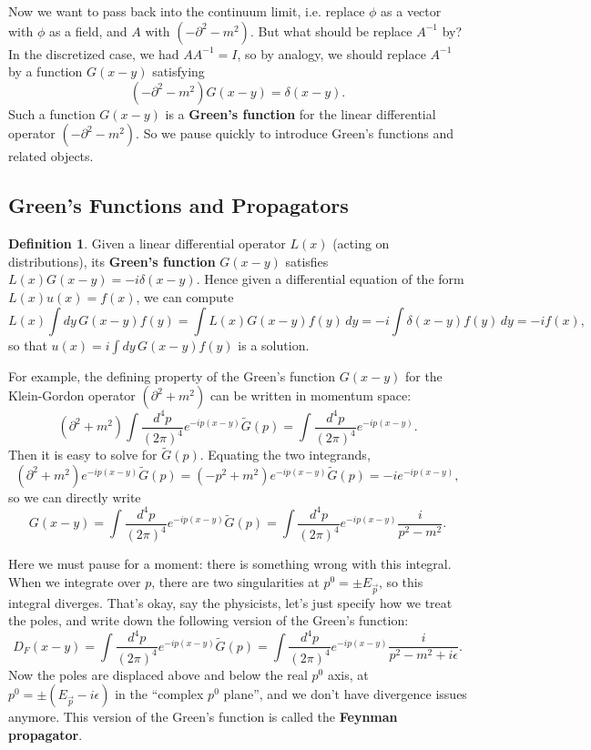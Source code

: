 \documentclass{report}
\theoremstyle{plain}
\theoremstyle{definition}
\newtheorem{definition}[theorem]{Definition}
\theoremstyle{remark}
\begin{document}
Now we want to pass back into the continuum limit, i.e. replace $\phi$
as a vector with $\phi$ as a field, and $A$ with
$(-\partial^2 - m^2)$. But what should be replace $A^{-1}$ by? In the
discretized case, we had $AA^{-1} = I$, so by analogy, we should
replace $A^{-1}$ by a function $G(x - y)$ satisfying
$$ (-\partial^2 - m^2)G(x - y) = \delta(x - y). $$
Such a function $G(x - y)$ is a {\bf Green's function} for the linear
differential operator $(-\partial^2 - m^2)$. So we pause quickly to
introduce Green's functions and related objects.

\subsection{Green's Functions and Propagators}

\begin{definition}
  Given a linear differential operator $L(x)$ (acting on
  distributions), its {\bf Green's function} $G(x - y)$ satisfies
  $L(x)G(x - y) = -i\delta(x - y)$. Hence given a differential
  equation of the form $L(x)u(x) = f(x)$, we can compute
  $$ L(x) \int dy \, G(x - y)f(y) = \int L(x) G(x - y) f(y) \, dy = -i \int \delta(x - y) f(y) \, dy = -i f(x), $$
  so that $u(x) = i \int dy \, G(x - y) f(y)$ is a solution.
\end{definition}

For example, the defining property of the Green's function $G(x - y)$
for the Klein-Gordon operator $(\partial^2 + m^2)$ can be written in
momentum space:
$$ (\partial^2 + m^2) \int \frac{d^4p}{(2\pi)^4} e^{-ip(x-y)} \tilde{G}(p) = \int \frac{d^4p}{(2\pi)^4} e^{-ip(x-y)}. $$
Then it is easy to solve for $\tilde{G}(p)$. Equating the two
integrands,
$$ (\partial^2 + m^2) e^{-ip(x-y)} \tilde{G}(p) = (-p^2 + m^2) e^{-ip(x-y)} \tilde{G}(p) = -i e^{-ip(x-y)}, $$
so we can directly write
$$ G(x - y) = \int \frac{d^4p}{(2\pi)^4} e^{-ip(x-y)} \tilde{G}(p) = \int \frac{d^4p}{(2\pi)^4} e^{-ip(x-y)} \frac{i}{p^2 - m^2}. $$

Here we must pause for a moment: there is something wrong with this
integral. When we integrate over $p$, there are two singularities at
$p^0 = \pm E_{\vec p}$, so this integral diverges. That's okay, say
the physicists, let's just specify how we treat the poles, and write
down the following version of the Green's function:
$$ D_F(x - y) = \int \frac{d^4p}{(2\pi)^4} e^{-ip(x-y)} \tilde{G}(p) = \int \frac{d^4p}{(2\pi)^4} e^{-ip(x-y)} \frac{i}{p^2 - m^2 + i\epsilon}. $$
Now the poles are displaced above and below the real $p^0$ axis, at
$p^0 = \pm (E_{\vec p} - i\epsilon)$ in the ``complex $p^0$ plane'',
and we don't have divergence issues anymore. This version of the
Green's function is called the {\bf Feynman propagator}.
\end{document}
